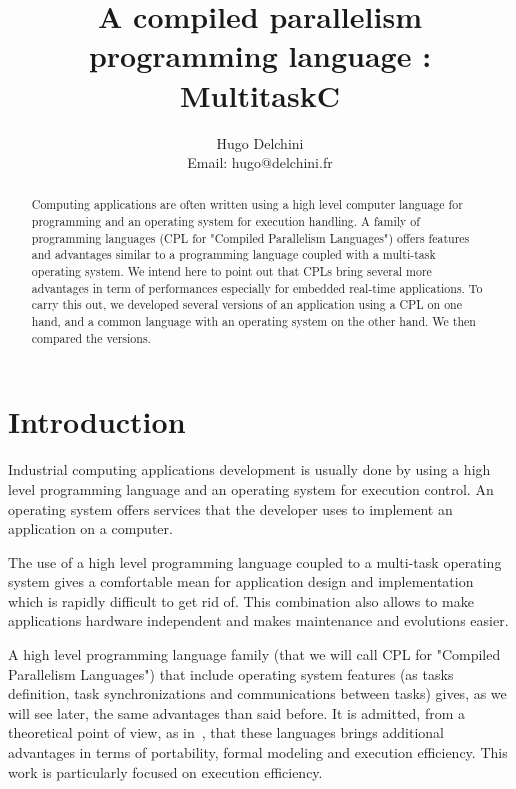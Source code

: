 \documentclass[10pt]{report}
\begin{document}
\title{A compiled parallelism programming language : MultitaskC}

\author{
Hugo Delchini\\
Email: hugo@delchini.fr\\
}

\maketitle
\thispagestyle{empty}

\begin{abstract}

Computing applications are often written using a high level computer language for programming and an
operating system for execution handling. A family of programming languages (CPL for "Compiled Parallelism
Languages") offers features and advantages similar to a programming language coupled with a multi-task
operating system. We intend here to point out that CPLs bring several more advantages in term of performances
especially for embedded real-time applications. To carry this out, we developed several versions of
an application using a CPL on one hand, and a common language with an operating system on the other hand.
We then compared the versions.

\end{abstract}

\chapter{Introduction}
\label{sec:intro}

Industrial computing applications development is usually done by using a high level programming language
and an operating system for execution control. An operating system offers services that the developer
uses to implement an application on a computer.

The use of a high level programming language coupled to a multi-task operating system gives a comfortable
mean for application design and implementation which is rapidly difficult to get rid of. This combination
also allows to make applications hardware independent and makes maintenance and evolutions easier.

A high level programming language family (that we will call CPL for "Compiled Parallelism Languages")
that include operating system features (as tasks definition, task synchronizations and communications
between tasks) gives, as we will see later, the same advantages than said before. It is admitted, from a
theoretical point of view, as in~\cite{Halbwachs:91}, that these languages brings additional advantages
in terms of portability, formal modeling and execution efficiency. This work is particularly focused on
execution efficiency.
\end{document}
